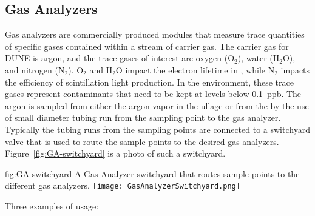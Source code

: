 \subsection{Gas Analyzers}
\label{sec:fdgen-slow-cryo-gas-anlyz}

 Gas analyzers are commercially produced modules that measure trace quantities of specific gases contained within a stream of carrier gas. The carrier gas for DUNE is argon, and the trace gases of interest are oxygen ($\text{O}_2$), water ($\text{H}_2\text{O}$), and nitrogen ($\text{N}_2$). $\text{O}_2$ and $\text{H}_2\text{O}$ impact the electron lifetime in , while $\text{N}_2$ impacts the efficiency of scintillation light production. In the  environment, these trace gases represent contaminants that need to be kept at levels below \SI{0.1}{ppb}.
The argon is sampled from either the argon vapor in the ullage or from the  by the use of small diameter tubing run from the sampling point to the gas analyzer. Typically the tubing runs from the sampling points are connected to a switchyard valve that is used to route the sample points to the desired gas analyzers. Figure~\ref{fig:GA-switchyard} is a photo of such a switchyard.

\begin{dunefigure}{fig:GA-switchyard}
  {A Gas Analyzer switchyard that routes sample points to the different gas analyzers.}
  \texttt{[image: GasAnalyzerSwitchyard.png]}%
\end{dunefigure}

Three examples of usage:

